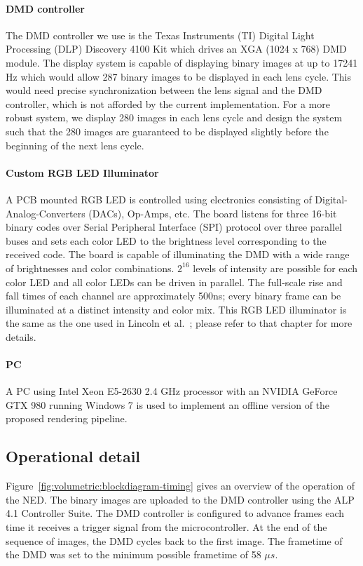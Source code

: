 \paragraph{DMD controller} 
The DMD controller we use is the Texas Instruments (TI) Digital Light Processing (DLP) Discovery 4100 Kit which drives an XGA (1024 x 768) DMD module. The display system is capable of displaying binary images at up to 17241 Hz which would allow 287 binary images to be displayed in each lens cycle. This would need precise synchronization between the lens signal and the DMD controller, which is not afforded by the current implementation. For a more robust system, we display 280 images in each lens cycle and design the system such that the 280 images are guaranteed to be displayed slightly before the beginning of the next lens cycle. 

\paragraph{Custom RGB LED Illuminator}
A PCB mounted RGB LED is controlled using electronics consisting of Digital-Analog-Converters (DACs), Op-Amps, etc. The board listens for three 16-bit binary codes over Serial Peripheral Interface (SPI) protocol over three parallel buses and sets each color LED to the brightness level corresponding to the received code. The board is capable of illuminating the DMD with a wide range of brightnesses and color combinations. $2^{16}$ levels of intensity are possible for each color LED and all color LEDs can be driven in parallel. The full-scale rise and fall times of each channel are approximately 500ns; every binary frame can be illuminated at a distinct intensity and color mix. This RGB LED illuminator is the same as the one used in Lincoln et al.~\cite{Lincoln2017scene}; please refer to that chapter for more details. 

\paragraph{PC}
A PC using Intel Xeon E5-2630 2.4 GHz processor with an NVIDIA GeForce GTX 980 running Windows 7 is used to implement an offline version of the proposed rendering pipeline. 


\subsection{Operational detail}
Figure~\ref{fig:volumetric:blockdiagram-timing} gives an overview of the operation of the NED. The binary images are uploaded to the DMD controller using the ALP 4.1 Controller Suite. The DMD controller is configured to advance frames each time it receives a trigger signal from the microcontroller. At the end of the sequence of images, the DMD cycles back to the first image. The frametime of the DMD was set to the minimum possible frametime of 58 $\mu s$.

